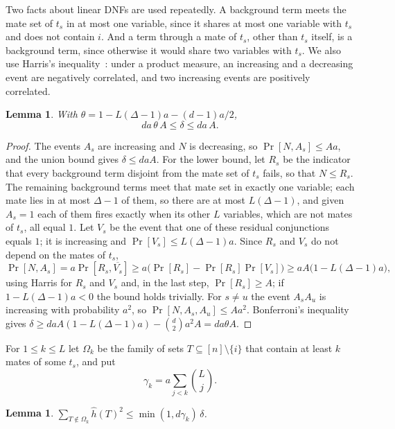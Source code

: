 \documentclass[11pt]{amsart}
\newtheorem{lemma}[theorem]{Lemma}
\theoremstyle{remark}
\begin{document}
Two facts about linear DNFs are used repeatedly. A background term meets the mate set of $t_s$ in at most one variable,
since it shares at most one variable with $t_s$ and does not contain $i$. And a term through a mate of $t_s$, other than
$t_s$ itself, is a background term, since otherwise it would share two variables with $t_s$. We also use Harris's
inequality~\cite{Harris}: under a product measure, an increasing and a decreasing event are negatively correlated, and
two increasing events are positively correlated.

\begin{lemma}\label{lem:A}
With $\theta=1-L(\Delta-1)a-(d-1)a/2$,
\[
da\,\theta\,A\le\delta\le da\,A.
\]
\end{lemma}

\begin{proof}
The events $A_s$ are increasing and $N$ is decreasing, so $\Pr[N,A_s]\le Aa$, and the union bound gives $\delta\le
daA$. For the lower bound, let $R_s$ be the indicator that every background term disjoint from the mate set of $t_s$
fails, so that $N\le R_s$. The remaining background terms meet that mate set in exactly one variable; each mate lies in
at most $\Delta-1$ of them, so there are at most $L(\Delta-1)$, and given $A_s=1$ each of them fires exactly when its other $L$
variables, which are not mates of $t_s$, all equal $1$. Let $V_s$ be the event that one of these residual conjunctions
equals $1$; it is increasing and $\Pr[V_s]\le L(\Delta-1)a$. Since $R_s$ and $V_s$ do not depend on the mates of $t_s$,
\[
\Pr[N,A_s]=a\Pr[R_s,\overline{V_s}]\ge a\bigl(\Pr[R_s]-\Pr[R_s]\Pr[V_s]\bigr)\ge aA\bigl(1-L(\Delta-1)a\bigr),
\]
using Harris for $R_s$ and $V_s$ and, in the last step, $\Pr[R_s]\ge A$; if $1-L(\Delta-1)a<0$ the bound holds trivially.
For $s\neq u$ the event $A_sA_u$ is increasing with probability $a^2$, so $\Pr[N,A_s,
A_u]\le Aa^2$. Bonferroni's inequality gives $\delta\ge daA(1-L(\Delta-1)a)-\binom d2a^2A=da\theta A$.
\end{proof}

For $1\le k\le L$ let $\Omega_k$ be the family of sets $T\subseteq[n]\setminus\{i\}$ that contain at least $k$ mates of
some $t_s$, and put
\[
\gamma_k=a\sum_{j<k}\binom Lj.
\]

\begin{lemma}\label{lem:h}
$\sum_{T\notin\Omega_k}\hat h(T)^2\le\min(1,d\gamma_k)\,\delta$.
\end{lemma}
\end{document}
